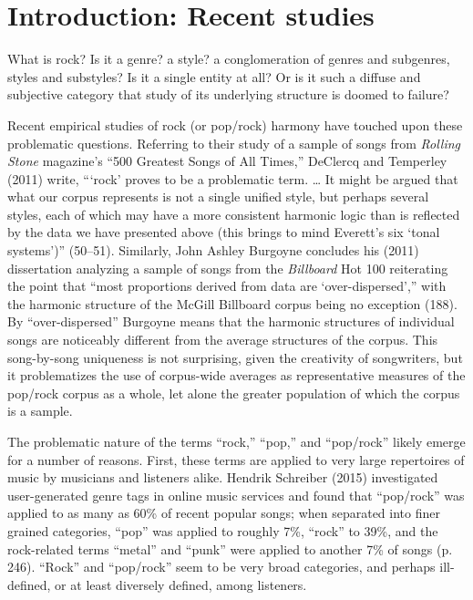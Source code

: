 \chapter{Introduction: Recent studies}
\label{introduction:recentstudies}

What is rock? Is it a genre? a style? a conglomeration of genres and subgenres, styles and substyles? Is it a single entity at all? Or is it such a diffuse and subjective category that study of its underlying structure is doomed to failure?

Recent empirical studies of rock (or pop\slash rock) harmony have touched upon these problematic questions. Referring to their study of a sample of songs from \emph{Rolling Stone} magazine's ``500 Greatest Songs of All Times,'' DeClercq and Temperley (2011) write, ```rock' proves to be a problematic term. {\ldots} It might be argued that what our corpus represents is not a single unified style, but perhaps several styles, each of which may have a more consistent harmonic logic than is reflected by the data we have presented above (this brings to mind Everett's six `tonal systems')'' (50–51). Similarly, John Ashley Burgoyne concludes his (2011) dissertation analyzing a sample of songs from the \emph{Billboard} Hot 100 reiterating the point that ``most proportions derived from data are `over-dispersed','' with the harmonic structure of the McGill Billboard corpus being no exception (188). By ``over-dispersed'' Burgoyne means that the harmonic structures of individual songs are noticeably different from the average structures of the corpus. This song-by-song uniqueness is not surprising, given the creativity of songwriters, but it problematizes the use of corpus-wide averages as representative measures of the pop\slash rock corpus as a whole, let alone the greater population of which the corpus is a sample.

The problematic nature of the terms ``rock,'' ``pop,'' and ``pop\slash rock'' likely emerge for a number of reasons. First, these terms are applied to very large repertoires of music by musicians and listeners alike. Hendrik Schreiber (2015) investigated user-generated genre tags in online music services and found that ``pop\slash rock'' was applied to as many as 60\% of recent popular songs; when separated into finer grained categories, ``pop'' was applied to roughly 7\%, ``rock'' to 39\%, and the rock-related terms ``metal'' and ``punk'' were applied to another 7\% of songs (p. 246). ``Rock'' and ``pop\slash rock'' seem to be very broad categories, and perhaps ill-defined, or at least diversely defined, among listeners.

